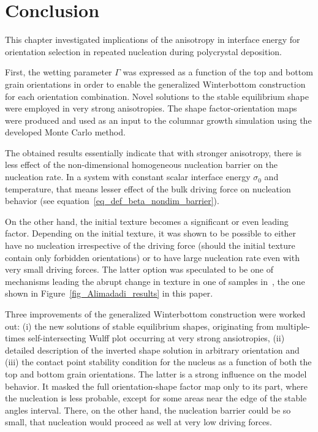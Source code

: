 \section{Conclusion}
This chapter investigated implications of the anisotropy in interface energy for orientation selection in repeated nucleation during polycrystal deposition. 

First, the wetting parameter $\Gamma$ was expressed as a function of the top and bottom grain orientations in order to enable the generalized Winterbottom construction for each orientation combination. Novel solutions to the stable equilibrium shape were employed in very strong anisotropies. The shape factor-orientation maps were produced and used as an input to the columnar growth simulation using the developed Monte Carlo method.

The obtained results essentially indicate that with stronger anisotropy, there is less effect of the non-dimensional homogeneous nucleation barrier on the nucleation rate. In a system with constant scalar interface energy $\sigma_0$ and temperature, that means lesser effect of the bulk driving force on nucleation behavior (see equation~\eqref{eq_def_beta_nondim_barrier}). 

On the other hand, the initial texture becomes a significant or even leading factor. Depending on the initial texture, it was shown to be possible to either have no nucleation irrespective of the driving force (should the initial texture contain only forbidden orientations) or to have large nucleation rate even with very small driving forces. The latter option was speculated to be one of mechanisms leading the abrupt change in texture in one of samples in~\cite{Alimadadi2016}, the one shown in Figure~\ref{fig_Alimadadi_results} in this paper.

Three improvements of the generalized Winterbottom construction were worked out: (i) the new solutions of stable equilibrium shapes, originating from multiple-times self-intersecting Wulff plot occurring at very strong ansiotropies, (ii) detailed description of the inverted shape solution in arbitrary orientation and (iii) the contact point stability condition for the nucleus as a function of both the top and bottom grain orientations. The latter is a strong influence on the model behavior. It masked the full orientation-shape factor map only to its part, where the nucleation is less probable, except for some areas near the edge of the stable angles interval. There, on the other hand, the nucleation barrier could be so small, that nucleation would proceed as well at very low driving forces. 

